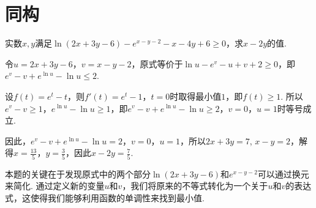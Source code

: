 \section{同构}

\begin{exe}
实数$x,y$满足$\ln(2x+3y-6)-e^{x-y-2}-x-4y+6\geq0$，求$x-2y$的值.
\end{exe}
\begin{sol}
令$u=2x+3y-6$，$v=x-y-2$，原式等价于$\ln u-e^v-u+v+2\geq0$，即$e^v-v+e^{\ln u}-\ln u\leq2$. 

设$f(t)=e^t-t$，则$f'(t)=e^t-1$，$t=0$时取得最小值$1$，即$f(t)\geq1$. 所以$e^v-v\geq1$，$e^{\ln u}-\ln u\geq1$，即$e^v-v+e^{\ln u}-\ln u\geq2$，$v=0$，$u=1$时等号成立. 

因此，$e^v-v+e^{\ln u}-\ln u=2$，$v=0$，$u=1$，所以$2x+3y=7$, $x-y=2$，解得$x=\frac{13}{5}$，$y=\frac{3}{5}$，因此$x-2y=\frac{7}{5}$. 
\end{sol}
\begin{note}
本题的关键在于发现原式中的两个部分$\ln(2x+3y-6)$和$e^{x-y-2}$可以通过换元来简化. 通过定义新的变量$u$和$v$，我们将原来的不等式转化为一个关于$u$和$v$的表达式，这使得我们能够利用函数的单调性来找到最小值. 
\end{note}